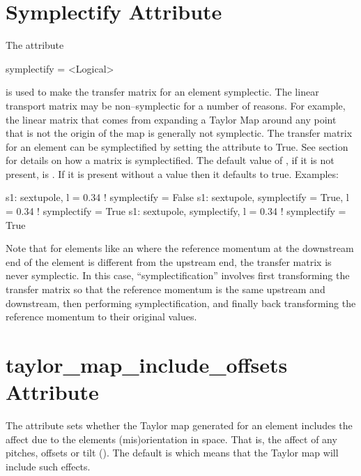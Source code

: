 \section{Symplectify Attribute}
\label{s:symp}

The  attribute
\begin{example}
  symplectify = <Logical>
\end{example}
is used to make the transfer matrix for an element symplectic. The linear transport matrix may be
non--symplectic for a number of reasons.  For example, the linear matrix that comes from expanding a
Taylor Map around any point that is not the origin of the map is generally not symplectic. The
transfer matrix for an element can be symplectified by setting the  attribute to
True. See section~ for details on how a matrix is symplectified. The default
value of , if it is not present, is . If it is present without a value
then it defaults to true. Examples:
\begin{example}
  s1: sextupole, l = 0.34                       ! symplectify = False
  s1: sextupole, symplectify = True, l = 0.34   ! symplectify = True
  s1: sextupole, symplectify, l = 0.34          ! symplectify = True
\end{example}

\label{lcavity} Note that for elements like an  where the
reference momentum at the downstream end of the element is different
from the upstream end, the transfer matrix is never symplectic. In
this case, ``symplectification'' involves first transforming the
transfer matrix so that the reference momentum is the same upstream
and downstream, then performing symplectification, and finally back
transforming the reference momentum to their original values.

\section{taylor_map_include_offsets Attribute}
\label{s:mapoff}

The  attribute sets whether the Taylor map
generated for an element includes the affect due to the elements
(mis)orientation in space. That is, the affect of any pitches, offsets
or tilt (). The default is  which means that
the Taylor map will include such effects. 

